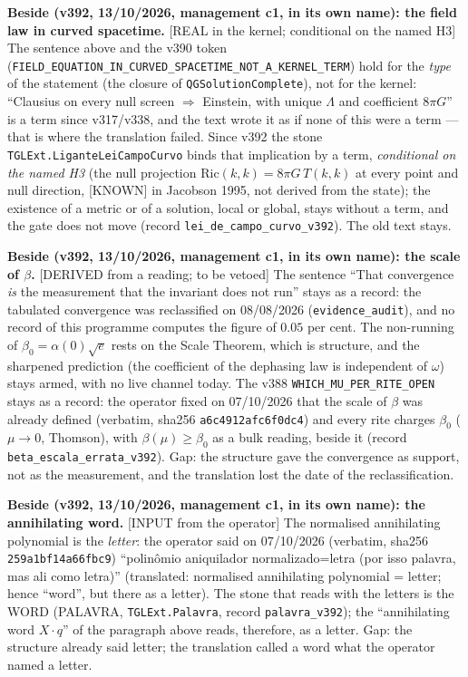 \documentclass[11pt]{article}
\theoremstyle{definition}\newtheorem{deriv}{Derivation}
\begin{document}
\textbf{Beside (v392, 13/10/2026, management c1, in its own name): the field law in curved spacetime.} \textsf{[REAL in the kernel; conditional on the named H3]} The sentence above and the v390 token (\texttt{FIELD\_EQUATION\_IN\_CURVED\_SPACETIME\_NOT\_A\_KERNEL\_TERM}) hold for the \emph{type} of the statement (the closure of \texttt{QGSolutionComplete}), not for the kernel: ``Clausius on every null screen $\Rightarrow$ Einstein, with unique $\Lambda$ and coefficient $8\pi G$'' is a term since v317/v338, and the text wrote it as if none of this were a term --- that is where the translation failed. Since v392 the stone \texttt{TGLExt.LiganteLeiCampoCurvo} binds that implication by a term, \emph{conditional on the named H3} (the null projection $\mathrm{Ric}(k,k)=8\pi G\,T(k,k)$ at every point and null direction, \textsf{[KNOWN]} in Jacobson 1995, not derived from the state); the existence of a metric or of a solution, local or global, stays without a term, and the gate does not move (record \texttt{lei\_de\_campo\_curvo\_v392}). The old text stays.

\textbf{Beside (v392, 13/10/2026, management c1, in its own name): the scale of $\beta$.} \textsf{[DERIVED from a reading; to be vetoed]} The sentence ``That convergence \emph{is} the measurement that the invariant does not run'' stays as a record: the tabulated convergence was reclassified on 08/08/2026 (\texttt{evidence\_audit}), and no record of this programme computes the figure of $0.05$ per cent. The non-running of $\beta_0=\alpha(0)\sqrt e$ rests on the Scale Theorem, which is structure, and the sharpened prediction (the coefficient of the dephasing law is independent of $\omega$) stays armed, with no live channel today. The v388 \texttt{WHICH\_MU\_PER\_RITE\_OPEN} stays as a record: the operator fixed on 07/10/2026 that the scale of $\beta$ was already defined (verbatim, sha256 \texttt{a6c4912afc6f0dc4}) and every rite charges $\beta_0$ ($\mu\to0$, Thomson), with $\beta(\mu)\geq\beta_0$ as a bulk reading, beside it (record \texttt{beta\_escala\_errata\_v392}). Gap: the structure gave the convergence as support, not as the measurement, and the translation lost the date of the reclassification.

\textbf{Beside (v392, 13/10/2026, management c1, in its own name): the annihilating word.} \textsf{[INPUT from the operator]} The normalised annihilating polynomial is the \emph{letter}: the operator said on 07/10/2026 (verbatim, sha256 \texttt{259a1bf14a66fbc9}) ``polinômio aniquilador normalizado=letra (por isso palavra, mas ali como letra)'' (translated: normalised annihilating polynomial = letter; hence ``word'', but there as a letter). The stone that reads with the letters is the WORD (PALAVRA, \texttt{TGLExt.Palavra}, record \texttt{palavra\_v392}); the ``annihilating word $X\cdot q$'' of the paragraph above reads, therefore, as a letter. Gap: the structure already said letter; the translation called a word what the operator named a letter.
\end{document}
